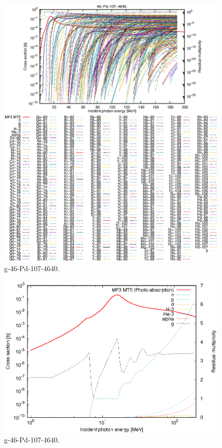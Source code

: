 \begin{figure}
 \includegraphics[width=\linewidth]{eps/g_46-Pd-107_4640.eps}
  \caption{g-46-Pd-107-4640.}
\end{figure}
\newpage \clearpage

\begin{figure}
 \includegraphics[width=\linewidth]{eps-log/g_46-Pd-107_4640.eps}
 \caption{g-46-Pd-107-4640.}
\end{figure}
\newpage \clearpage

